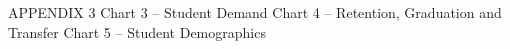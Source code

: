APPENDIX 3
Chart 3 – Student Demand
Chart 4 – Retention, Graduation and Transfer
Chart 5 – Student Demographics